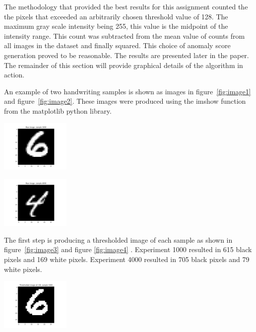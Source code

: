 The methodology that provided the best results for this assignment counted the the pixels that exceeded an arbitrarily chosen threshold value of 128. The maximum gray scale intensity being 255, this value is the midpoint of the intensity range. This count was subtracted from the mean value of counts from all images in the dataset and finally squared. This choice of anomaly score generation proved to be reasonable. The results are presented later in the paper. The remainder of this section will provide graphical details of the algorithm in action.

An example of two handwriting samples is shown as images in figure~\ref{fig:image1} and figure~\ref{fig:image2}. These images were produced using the imshow function from the matplotlib python library.


\begin{center}
\includegraphics[width=0.25\textwidth]{image1.png}
\end{center}

\begin{center}
\includegraphics[width=0.25\textwidth]{image2.png}
\end{center}

The first step is producing a thresholded image of each sample as shown in figure~\ref{fig:image3} and figure \ref{fig:image4} . Experiment 1000 resulted in 615 black pixels and 169 white pixels. Experiment 4000 resulted in 705 black pixels and 79 white pixels.

\begin{center}
\includegraphics[width=0.25\textwidth]{image3.png}
\end{center}


